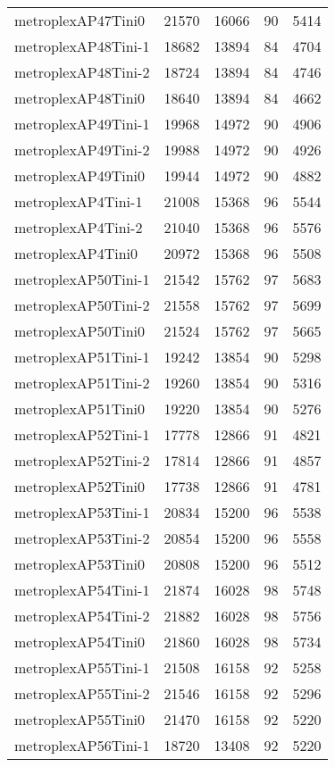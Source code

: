 \begin{tabular}{lrrrr}
metroplexAP47Tini0 & 21570 & 16066 & 90 & 5414 \\
metroplexAP48Tini-1 & 18682 & 13894 & 84 & 4704 \\
metroplexAP48Tini-2 & 18724 & 13894 & 84 & 4746 \\
metroplexAP48Tini0 & 18640 & 13894 & 84 & 4662 \\
metroplexAP49Tini-1 & 19968 & 14972 & 90 & 4906 \\
metroplexAP49Tini-2 & 19988 & 14972 & 90 & 4926 \\
metroplexAP49Tini0 & 19944 & 14972 & 90 & 4882 \\
metroplexAP4Tini-1 & 21008 & 15368 & 96 & 5544 \\
metroplexAP4Tini-2 & 21040 & 15368 & 96 & 5576 \\
metroplexAP4Tini0 & 20972 & 15368 & 96 & 5508 \\
metroplexAP50Tini-1 & 21542 & 15762 & 97 & 5683 \\
metroplexAP50Tini-2 & 21558 & 15762 & 97 & 5699 \\
metroplexAP50Tini0 & 21524 & 15762 & 97 & 5665 \\
metroplexAP51Tini-1 & 19242 & 13854 & 90 & 5298 \\
metroplexAP51Tini-2 & 19260 & 13854 & 90 & 5316 \\
metroplexAP51Tini0 & 19220 & 13854 & 90 & 5276 \\
metroplexAP52Tini-1 & 17778 & 12866 & 91 & 4821 \\
metroplexAP52Tini-2 & 17814 & 12866 & 91 & 4857 \\
metroplexAP52Tini0 & 17738 & 12866 & 91 & 4781 \\
metroplexAP53Tini-1 & 20834 & 15200 & 96 & 5538 \\
metroplexAP53Tini-2 & 20854 & 15200 & 96 & 5558 \\
metroplexAP53Tini0 & 20808 & 15200 & 96 & 5512 \\
metroplexAP54Tini-1 & 21874 & 16028 & 98 & 5748 \\
metroplexAP54Tini-2 & 21882 & 16028 & 98 & 5756 \\
metroplexAP54Tini0 & 21860 & 16028 & 98 & 5734 \\
metroplexAP55Tini-1 & 21508 & 16158 & 92 & 5258 \\
metroplexAP55Tini-2 & 21546 & 16158 & 92 & 5296 \\
metroplexAP55Tini0 & 21470 & 16158 & 92 & 5220 \\
metroplexAP56Tini-1 & 18720 & 13408 & 92 & 5220 \\

\end{tabular}
